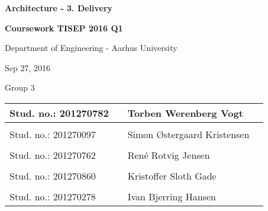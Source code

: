 
\centerline{\Huge\bfseries\color{ThemeColor} Architecture - 3. Delivery}

\vspace{1em}
\centerline{\Large\bfseries\color{BlackColor} Coursework TISEP 2016 Q1}



\vspace{5em}
\centerline{\large\bfseries\color{BlackColor}}
\centerline{\large\color{BlackColor}Department of Engineering - Aarhus University}

\vspace{0.5em}
\centerline{\large\color{BlackColor} Sep 27, 2016}

\vspace{0.5em}
\centerline{\large\color{BlackColor} Group 3}

\vspace{25em}

\begin{center}
   \begin{tabular}{ l p{3cm} l l }
   Stud. no.: 201270782 && Torben Werenberg Vogt & \\\hline
   & & \\
   Stud. no.: 201270097 && Simon Østergaard Kristensen & \\\hline
   & & \\
   Stud. no.: 201270762 && René Rotvig Jensen & \\\hline
   & & \\
   Stud. no.: 201270860 && Kristoffer Sloth Gade & \\\hline
   & & \\
   Stud. no.: 201270278 &&  Ivan Bjerring Hansen & \\\hline
   \end{tabular}
\end{center}
\thispagestyle{empty} %
\restoregeometry

